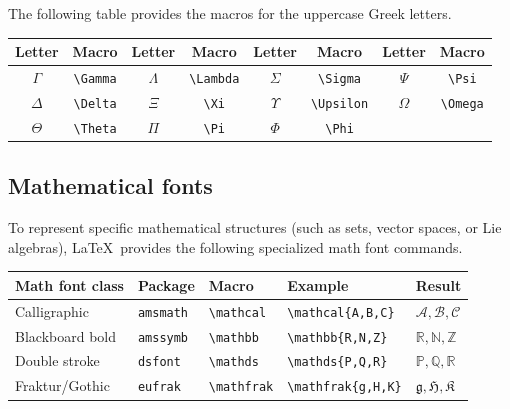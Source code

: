 		The following table provides the macros for the uppercase Greek letters.
		\begin{table}[h!]
			\centering
			\begin{tabular}{|cc|cc|cc|cc|}
				\hline
				\textbf{Letter} & \textbf{Macro} & \textbf{Letter} & \textbf{Macro} & \textbf{Letter} & \textbf{Macro} & \textbf{Letter} & \textbf{Macro} \\
				\hline
				{$\Gamma$} & {\lstinline|\Gamma|} & {$\Lambda$} & {\lstinline|\Lambda|} & {$\Sigma$} & {\lstinline|\Sigma|} & {$\Psi$} & {\lstinline|\Psi|} \\
				{$\Delta$} & {\lstinline|\Delta|} & {$\Xi$} & {\lstinline|\Xi|} & {$\Upsilon$} & {\lstinline|\Upsilon|} & {$\Omega$} & {\lstinline|\Omega|} \\
				{$\Theta$} & {\lstinline|\Theta|} & {$\Pi$} & {\lstinline|\Pi|} & {$\Phi$} & {\lstinline|\Phi|} & {} & {} \\
				\hline
			\end{tabular}
		\end{table}
	
	\subsection{Mathematical fonts}
		To represent specific mathematical structures (such as sets, vector spaces, or Lie algebras), \LaTeX\ provides the following specialized math font commands.
		\begin{table}[h!]
			\centering
			\begin{tabular}{lllll}
				\toprule[1.5pt]
				\textbf{Math font class} & \textbf{Package} & \textbf{Macro} & \textbf{Example} & \textbf{Result} \\
				\midrule
				{Calligraphic} & {\lstinline|amsmath|} & {\lstinline|\mathcal|} & {\lstinline|\mathcal{A,B,C}|} & {$\mathcal{A,B,C}$} \\
				{Blackboard bold} & {\lstinline|amssymb|} & {\lstinline|\mathbb|} & {\lstinline|\mathbb{R,N,Z}|} & {$\mathbb{R,N,Z}$} \\
				{Double stroke} & {\lstinline|dsfont|} & {\lstinline|\mathds|} & {\lstinline|\mathds{P,Q,R}|} & {$\mathds{P,Q,R}$} \\
				{Fraktur/Gothic} & {\lstinline|eufrak|} & {\lstinline|\mathfrak|} & {\lstinline|\mathfrak{g,H,K}|} & {$\mathfrak{g,H,K}$} \\
				\bottomrule[1.5pt]
			\end{tabular}
		\end{table}